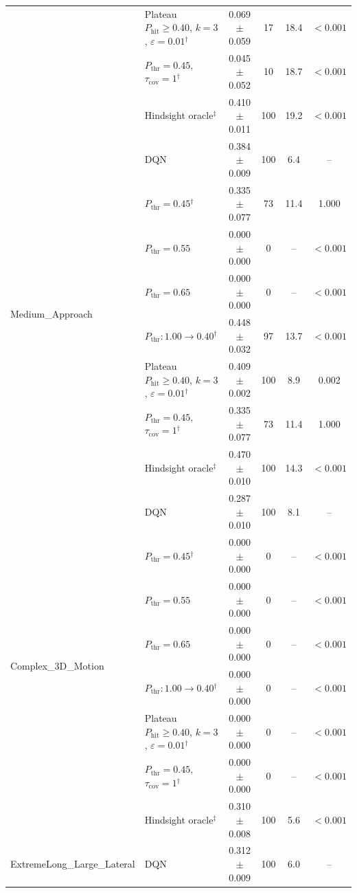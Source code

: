 \begin{table}[htbp]
\begin{tabular}{llcccc}
 & Plateau $P_{\mathrm{hit}}\geq0.40$, $k=3$, $\varepsilon=0.01$$^{\dagger}$ & 0.069 $\pm$ 0.059 & 17 & 18.4 & $<0.001$ \\
 & $P_{\mathrm{thr}}=0.45$, $\tau_{\mathrm{cov}}=1$$^{\dagger}$ & 0.045 $\pm$ 0.052 & 10 & 18.7 & $<0.001$ \\
 & Hindsight oracle$^{\ddagger}$ & 0.410 $\pm$ 0.011 & 100 & 19.2 & $<0.001$ \\
\midrule
\multirow{8}{*}{Medium\_Approach} & DQN & 0.384 $\pm$ 0.009 & 100 & 6.4 & -- \\
 & $P_{\mathrm{thr}}=0.45$$^{\dagger}$ & 0.335 $\pm$ 0.077 & 73 & 11.4 & 1.000 \\
 & $P_{\mathrm{thr}}=0.55$ & 0.000 $\pm$ 0.000 & 0 & -- & $<0.001$ \\
 & $P_{\mathrm{thr}}=0.65$ & 0.000 $\pm$ 0.000 & 0 & -- & $<0.001$ \\
 & $P_{\mathrm{thr}}: 1.00 \to 0.40$$^{\dagger}$ & 0.448 $\pm$ 0.032 & 97 & 13.7 & $<0.001$ \\
 & Plateau $P_{\mathrm{hit}}\geq0.40$, $k=3$, $\varepsilon=0.01$$^{\dagger}$ & 0.409 $\pm$ 0.002 & 100 & 8.9 & 0.002 \\
 & $P_{\mathrm{thr}}=0.45$, $\tau_{\mathrm{cov}}=1$$^{\dagger}$ & 0.335 $\pm$ 0.077 & 73 & 11.4 & 1.000 \\
 & Hindsight oracle$^{\ddagger}$ & 0.470 $\pm$ 0.010 & 100 & 14.3 & $<0.001$ \\
\midrule
\multirow{8}{*}{Complex\_3D\_Motion} & DQN & 0.287 $\pm$ 0.010 & 100 & 8.1 & -- \\
 & $P_{\mathrm{thr}}=0.45$$^{\dagger}$ & 0.000 $\pm$ 0.000 & 0 & -- & $<0.001$ \\
 & $P_{\mathrm{thr}}=0.55$ & 0.000 $\pm$ 0.000 & 0 & -- & $<0.001$ \\
 & $P_{\mathrm{thr}}=0.65$ & 0.000 $\pm$ 0.000 & 0 & -- & $<0.001$ \\
 & $P_{\mathrm{thr}}: 1.00 \to 0.40$$^{\dagger}$ & 0.000 $\pm$ 0.000 & 0 & -- & $<0.001$ \\
 & Plateau $P_{\mathrm{hit}}\geq0.40$, $k=3$, $\varepsilon=0.01$$^{\dagger}$ & 0.000 $\pm$ 0.000 & 0 & -- & $<0.001$ \\
 & $P_{\mathrm{thr}}=0.45$, $\tau_{\mathrm{cov}}=1$$^{\dagger}$ & 0.000 $\pm$ 0.000 & 0 & -- & $<0.001$ \\
 & Hindsight oracle$^{\ddagger}$ & 0.310 $\pm$ 0.008 & 100 & 5.6 & $<0.001$ \\
\midrule
\multirow{8}{*}{ExtremeLong\_Large\_Lateral} & DQN & 0.312 $\pm$ 0.009 & 100 & 6.0 & -- \\

\end{tabular}
\end{table}
